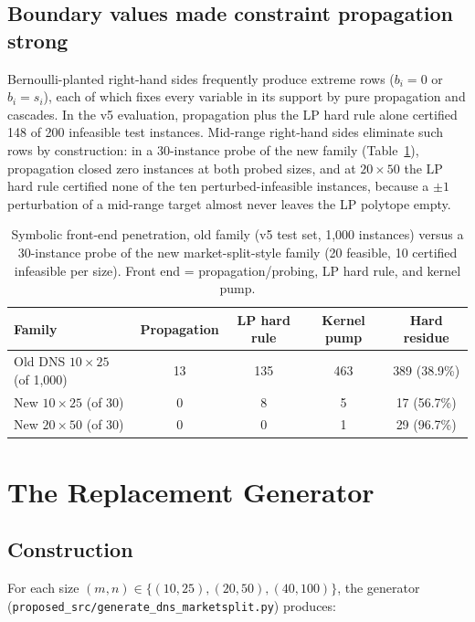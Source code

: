 \documentclass[12pt]{article}
\begin{document}
\subsection{Boundary values made constraint propagation strong}

Bernoulli-planted right-hand sides frequently produce extreme rows ($b_i = 0$ or $b_i = s_i$), each of which fixes every variable in its support by pure propagation and cascades. In the v5 evaluation, propagation plus the LP hard rule alone certified 148 of 200 infeasible test instances. Mid-range right-hand sides eliminate such rows by construction: in a 30-instance probe of the new family (Table~\ref{tab:probe}), propagation closed zero instances at both probed sizes, and at $20 \times 50$ the LP hard rule certified none of the ten perturbed-infeasible instances, because a $\pm 1$ perturbation of a mid-range target almost never leaves the LP polytope empty.

\begin{table}[t]
\centering
\caption{Symbolic front-end penetration, old family (v5 test set, 1{,}000 instances) versus a 30-instance probe of the new market-split-style family (20 feasible, 10 certified infeasible per size). Front end = propagation/probing, LP hard rule, and kernel pump.}
\label{tab:probe}
\begin{tabular}{lcccc}
\toprule
Family & Propagation & LP hard rule & Kernel pump & Hard residue \\
\midrule
Old DNS $10{\times}25$ (of 1{,}000) & 13 & 135 & 463 & 389 (38.9\%) \\
New $10{\times}25$ (of 30) & 0 & 8 & 5 & 17 (56.7\%) \\
New $20{\times}50$ (of 30) & 0 & 0 & 1 & 29 (96.7\%) \\
\bottomrule
\end{tabular}
\end{table}

\section{The Replacement Generator}
\label{sec:generator}

\subsection{Construction}

For each size $(m, n) \in \{(10,25), (20,50), (40,100)\}$, the generator (\texttt{proposed\_src/generate\_dns\_marketsplit.py}) produces:
\end{document}
